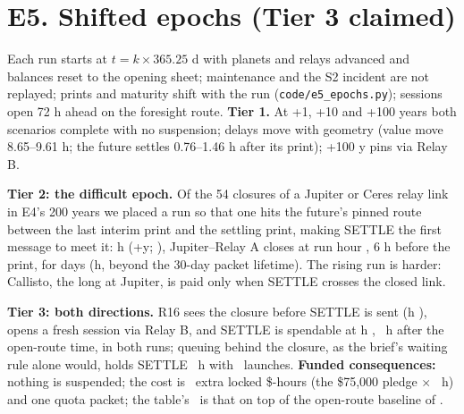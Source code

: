 \section*{E5. Shifted epochs (Tier 3 claimed)}

Each run starts at $t = k \times 365.25$ d with planets and relays advanced and balances reset to the opening sheet; maintenance and the S2 incident are not replayed; prints and maturity
shift with the run (\texttt{code/e5\_epochs.py}); sessions open 72 h ahead on the foresight route. \textbf{Tier 1.} At +1, +10 and +100 years both scenarios complete with no suspension;
delays move with geometry (value move 8.65--9.61 h; the future settles 0.76--1.46 h after its print); +100 y pins via Relay B.

\textbf{Tier 2: the difficult epoch.} Of the 54 closures of a Jupiter or Ceres relay link in E4's 200 years we placed a run so that one hits the future's pinned route between the last interim print and the settling print, making SETTLE the first message to meet it: h \EfiveHardH (+\EfiveHardY y; \EfiveHardDate), Jupiter--Relay A closes at run hour \EfiveClosureStart, 6 h before the print, for \EfiveClosureDays days (\EfiveClosureH h, beyond the 30-day packet lifetime). The rising run is harder: Callisto, the long at Jupiter, is paid only when SETTLE crosses the closed link.

\textbf{Tier 3: both directions.} R16 sees the closure before SETTLE is sent (h \EfiveRerouteAt), opens a fresh session via Relay B, and SETTLE is spendable at h \EfiveFRDone,
\EfiveLate\ h after the open-route time, in both runs; queuing behind the closure, as the brief's waiting rule alone would, holds SETTLE \EfiveNaiveLate\ h with \EfiveNaiveLaunches\ launches.
\textbf{Funded consequences:} nothing is suspended; the cost is \EfiveExtraUsdH\ extra locked \$-hours (the \$75{,}000 pledge $\times$ \EfiveLate\ h) and one quota packet; the table's
\EfiveTotalUsdH\ is that on top of the open-route baseline of \EfiveBaseUsdH.
